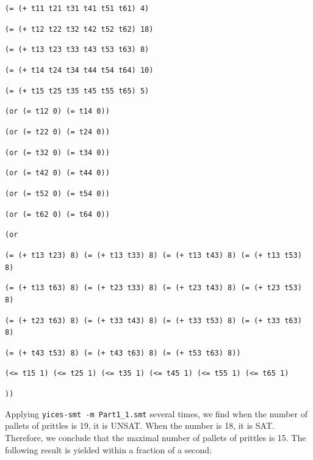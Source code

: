 \documentclass[11pt]{article}
\begin{document}
{{\tt (= (+ t11 t21 t31 t41 t51 t61) 4)}

{\tt (= (+ t12 t22 t32 t42 t52 t62) 18)}

{\tt (= (+ t13 t23 t33 t43 t53 t63) 8)}

{\tt (= (+ t14 t24 t34 t44 t54 t64) 10)}

{\tt (= (+ t15 t25 t35 t45 t55 t65) 5)}

{\tt (or (= t12 0) (= t14 0)) }

{\tt (or (= t22 0) (= t24 0)) }

{\tt (or (= t32 0) (= t34 0)) }

{\tt (or (= t42 0) (= t44 0)) }

{\tt (or (= t52 0) (= t54 0)) }

{\tt (or (= t62 0) (= t64 0)) }

{\tt (or}

{\tt (= (+ t13 t23) 8) (= (+ t13 t33) 8) (= (+ t13 t43) 8) (= (+ t13 t53) 8) }

{\tt (= (+ t13 t63) 8) (= (+ t23 t33) 8) (= (+ t23 t43) 8) (= (+ t23 t53) 8) }

{\tt (= (+ t23 t63) 8) (= (+ t33 t43) 8) (= (+ t33 t53) 8) (= (+ t33 t63) 8) }

{\tt (= (+ t43 t53) 8) (= (+ t43 t63) 8) (= (+ t53 t63) 8)) }

{\tt (<= t15 1) (<= t25 1) (<= t35 1) (<= t45 1) (<= t55 1) (<= t65 1)}

{\tt )) }
}

Applying {\tt yices-smt -m Part1\_1.smt} several times, we find when the number of pallets of prittles is 19, it is UNSAT. When the number is 18, it is SAT. Therefore, we conclude that the maximal number of pallets of prittles is 15.
The following result is yielded within a fraction of a second:
\end{document}
